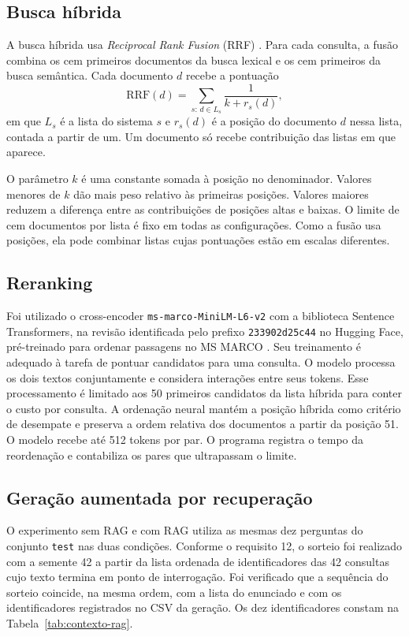 \documentclass[12pt]{article}
\begin{document}
\subsection{Busca híbrida}

A busca híbrida usa \textit{Reciprocal Rank Fusion} (RRF)
\cite{cormack2009}. Para cada consulta, a fusão combina os cem primeiros
documentos da busca lexical e os cem primeiros da busca semântica.
Cada documento \(d\) recebe a pontuação
\[
  \mathrm{RRF}(d)=\sum_{s:\, d\in L_s}\frac{1}{k+r_s(d)},
\]
em que \(L_s\) é a lista do sistema \(s\) e \(r_s(d)\) é a posição do
documento \(d\) nessa lista, contada a partir de um. Um documento só
recebe contribuição das listas em que aparece.

O parâmetro \(k\) é uma constante somada à posição no denominador.
Valores menores de \(k\) dão mais peso relativo às primeiras posições.
Valores maiores reduzem a diferença entre as contribuições de posições
altas e baixas. O limite de cem documentos por lista é fixo em todas as
configurações. Como a fusão usa posições, ela pode combinar listas cujas
pontuações estão em escalas diferentes.

\subsection{Reranking}

Foi utilizado o cross-encoder \texttt{ms-marco-MiniLM-L6-v2} com a biblioteca
Sentence Transformers, na revisão identificada pelo prefixo
\texttt{233902d25c44} no Hugging Face, pré-treinado para ordenar passagens no
MS MARCO \cite{crossencoder}. Seu treinamento é
adequado à tarefa de pontuar candidatos para uma consulta. O modelo processa
os dois textos conjuntamente e considera interações entre seus tokens.
Esse processamento é limitado aos 50 primeiros candidatos da lista
híbrida para conter o custo por consulta. A ordenação neural mantém a
posição híbrida como critério de desempate e preserva a ordem relativa dos
documentos a partir da posição 51. O modelo recebe até 512 tokens por par.
O programa registra o tempo da reordenação e contabiliza os pares que
ultrapassam o limite.

\subsection{Geração aumentada por recuperação}

O experimento sem RAG e com RAG utiliza as mesmas dez perguntas do conjunto
\texttt{test} nas duas condições. Conforme o requisito 12, o sorteio foi
realizado com a semente 42 a partir da lista ordenada de identificadores
das 42 consultas cujo texto termina em ponto de interrogação. Foi verificado
que a sequência do sorteio coincide, na mesma ordem, com a lista do
enunciado e com os identificadores registrados no CSV da geração.
Os dez identificadores constam na Tabela~\ref{tab:contexto-rag}.
\end{document}
